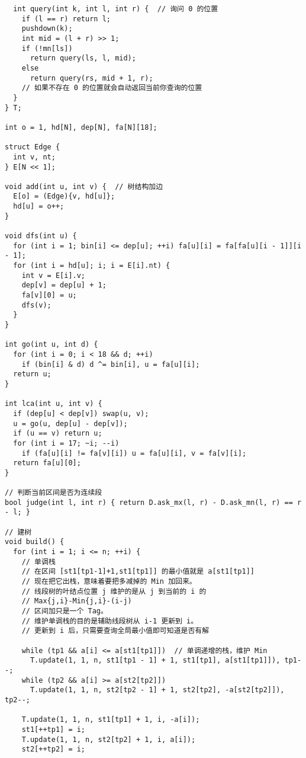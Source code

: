 \documentclass[12pt]{ctexart}
\begin{document}
\begin{lstlisting}
  int query(int k, int l, int r) {  // 询问 0 的位置
    if (l == r) return l;
    pushdown(k);
    int mid = (l + r) >> 1;
    if (!mn[ls])
      return query(ls, l, mid);
    else
      return query(rs, mid + 1, r);
    // 如果不存在 0 的位置就会自动返回当前你查询的位置
  }
} T;

int o = 1, hd[N], dep[N], fa[N][18];

struct Edge {
  int v, nt;
} E[N << 1];

void add(int u, int v) {  // 树结构加边
  E[o] = (Edge){v, hd[u]};
  hd[u] = o++;
}

void dfs(int u) {
  for (int i = 1; bin[i] <= dep[u]; ++i) fa[u][i] = fa[fa[u][i - 1]][i - 1];
  for (int i = hd[u]; i; i = E[i].nt) {
    int v = E[i].v;
    dep[v] = dep[u] + 1;
    fa[v][0] = u;
    dfs(v);
  }
}

int go(int u, int d) {
  for (int i = 0; i < 18 && d; ++i)
    if (bin[i] & d) d ^= bin[i], u = fa[u][i];
  return u;
}

int lca(int u, int v) {
  if (dep[u] < dep[v]) swap(u, v);
  u = go(u, dep[u] - dep[v]);
  if (u == v) return u;
  for (int i = 17; ~i; --i)
    if (fa[u][i] != fa[v][i]) u = fa[u][i], v = fa[v][i];
  return fa[u][0];
}

// 判断当前区间是否为连续段
bool judge(int l, int r) { return D.ask_mx(l, r) - D.ask_mn(l, r) == r - l; }

// 建树
void build() {
  for (int i = 1; i <= n; ++i) {
    // 单调栈
    // 在区间 [st1[tp1-1]+1,st1[tp1]] 的最小值就是 a[st1[tp1]]
    // 现在把它出栈，意味着要把多减掉的 Min 加回来。
    // 线段树的叶结点位置 j 维护的是从 j 到当前的 i 的
    // Max{j,i}-Min{j,i}-(i-j)
    // 区间加只是一个 Tag。
    // 维护单调栈的目的是辅助线段树从 i-1 更新到 i。
    // 更新到 i 后，只需要查询全局最小值即可知道是否有解

    while (tp1 && a[i] <= a[st1[tp1]])  // 单调递增的栈，维护 Min
      T.update(1, 1, n, st1[tp1 - 1] + 1, st1[tp1], a[st1[tp1]]), tp1--;
    while (tp2 && a[i] >= a[st2[tp2]])
      T.update(1, 1, n, st2[tp2 - 1] + 1, st2[tp2], -a[st2[tp2]]), tp2--;

    T.update(1, 1, n, st1[tp1] + 1, i, -a[i]);
    st1[++tp1] = i;
    T.update(1, 1, n, st2[tp2] + 1, i, a[i]);
    st2[++tp2] = i;


\end{lstlisting}
\end{document}
